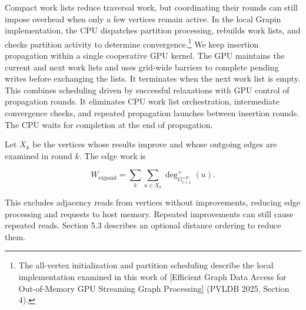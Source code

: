 Compact work lists reduce traversal work, but coordinating their rounds can still impose overhead when only a few vertices remain active. In the local Grapin implementation, the CPU dispatches partition processing, rebuilds work lists, and checks partition activity to determine convergence.\footnote{The all-vertex initialization and partition scheduling describe the local implementation examined in this work of [Efficient Graph Data Access for Out-of-Memory GPU Streaming Graph Processing] (PVLDB 2025, Section 4).} We keep insertion propagation within a single cooperative GPU kernel. The GPU maintains the current and next work lists and uses grid-wide barriers to complete pending writes before exchanging the lists. It terminates when the next work list is empty. This combines scheduling driven by successful relaxations with GPU control of propagation rounds. It eliminates CPU work list orchestration, intermediate convergence checks, and repeated propagation launches between insertion rounds. The CPU waits for completion at the end of propagation.

Let $X_k$ be the vertices whose results improve and whose outgoing edges are examined in round $k$. The edge work is

\[
W_{\mathrm{expand}}=
\sum_k\sum_{u\in X_k}\deg^+_{G_{t+1}^{+E}}(u).
\tag{5.3}
\]

This excludes adjacency reads from vertices without improvements, reducing edge processing and requests to host memory. Repeated improvements can still cause repeated reads. Section 5.3 describes an optional distance ordering to reduce them.

